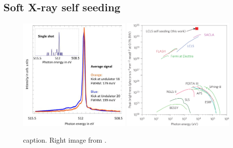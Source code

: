 \subsection{Soft X-ray self seeding}
\begin{figure}
	\centering
		\includegraphics[width=0.49\textwidth]{images/Soft-X-ray-self-seeding.jpg}
		\includegraphics[width=0.49\textwidth]{images/spectral-brightness-fletcher-2015.jpg}
	\caption{caption. Right image from \citep{Fletcher-2015-NatPho}.}
	\label{fig:soft-xray-self-seeding}
\end{figure}
